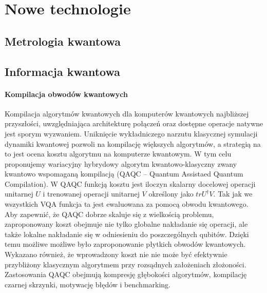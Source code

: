 \documentclass[a4paper,11pt]{article}
\begin{document}
\newpage 

\section{Nowe technologie}


\subsection{Metrologia kwantowa}

\subsection{Informacja kwantowa}

\paragraph{Kompilacja obwodów kwantowych} Kompilacja algorytmów kwantowych dla komputerów kwantowych najbliższej przyszłości, uwzględniająca architekturę połączeń oraz dostępne operacje natywne jest sporym wyzwaniem. Uniknięcie wykładniczego narzutu klasycznej symulacji dynamiki kwantowej pozwoli na kompilację większych algorytmów, a strategią na to jest ocena kosztu algorytmu na komputerze kwantowym. W tym celu proponujemy wariacyjny hybrydowy algorytm kwantowo-klasyczny zwany kwantowo wspomaganą kompilacją (QAQC -- Quantum Assistaed Quantum Compilation). 
%
W QAQC funkcją kosztu jest iloczyn skalarny docelowej operacji unitarnej $U$ i trenowanej operacji unitarnej $V$ określony jako $tr U^\dagger V$. Tak jak we wszystkich VQA funkcja ta jest ewaluowana za pomocą obwodu kwantowego.
%
Aby zapewnić, że QAQC dobrze skaluje się z wielkością problemu, zaproponowany koszt obejmuje nie tylko globalne nakładanie się operacji, ale także lokalne nakładanie się w odniesieniu do poszczególnych qubitów. Dzięki temu możliwe możliwe było zaproponowanie płytkich obwodów kwantowych. Wykazano również, że wprowadzony koszt nie nie może być efektywnie przybliżony klasycznym algorytmem przy rozsądnych założeniach złożoności.
% 
Zastosowania QAQC obejmują kompresję głębokości algorytmów, kompilację czarnej skrzynki, motywację błędów i benchmarking.
\end{document}

